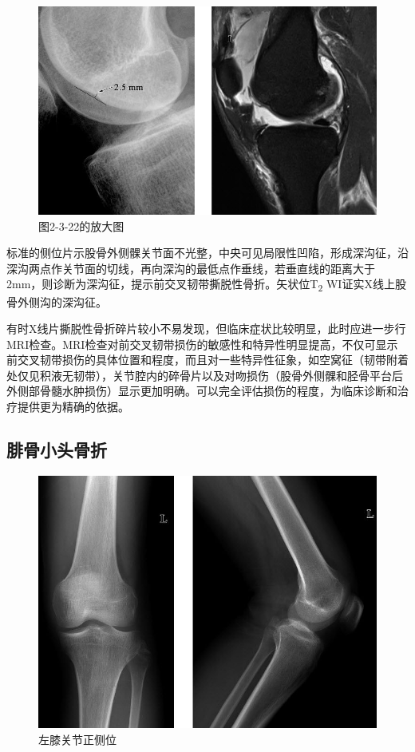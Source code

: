 \begin{figure}[!htbp]
 \centering
 \includegraphics{./images/Image00050.jpg}
 \captionsetup{justification=centering}
 \caption{图2-3-22的放大图}
 \label{fig2-3-23}
  \end{figure} 

标准的侧位片示股骨外侧髁关节面不光整，中央可见局限性凹陷，形成深沟征，沿深沟两点作关节面的切线，再向深沟的最低点作垂线，若垂直线的距离大于2mm，则诊断为深沟征，提示前交叉韧带撕脱性骨折。矢状位T\textsubscript{2}
WI证实X线上股骨外侧沟的深沟征。

有时X线片撕脱性骨折碎片较小不易发现，但临床症状比较明显，此时应进一步行MRI检查。MRI检查对前交叉韧带损伤的敏感性和特异性明显提高，不仅可显示前交叉韧带损伤的具体位置和程度，而且对一些特异性征象，如空窝征（韧带附着处仅见积液无韧带），关节腔内的碎骨片以及对吻损伤（股骨外侧髁和胫骨平台后外侧部骨髓水肿损伤）显示更加明确。可以完全评估损伤的程度，为临床诊断和治疗提供更为精确的依据。

\subsection{腓骨小头骨折}

\begin{figure}[!htbp]
 \centering
 \includegraphics{./images/Image00051.jpg}
 \captionsetup{justification=centering}
 \caption{左膝关节正侧位}
 \label{fig2-3-24}
  \end{figure} 

